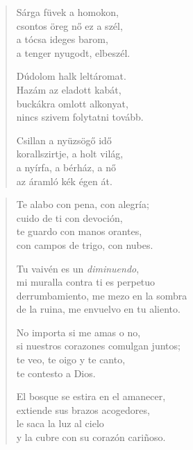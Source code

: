 \documentclass[11pt]{book}
\newcommand*{\centeredornament}{\centerline{\pgfornament[width=6cm]{88}}}
\begin{document}
\newpage

\vspace*{-15mm}
\centeredornament



\begin{verse}
  Sárga füvek a homokon, \\
  csontos öreg nő ez a szél, \\
  a tócsa ideges barom, \\
  a tenger nyugodt, elbeszél.

  Dúdolom halk leltáromat. \\
  Hazám az eladott kabát, \\
  buckákra omlott alkonyat, \\
  nincs szivem folytatni tovább.

  Csillan a nyüzsögő idő \\
  korallszirtje, a holt világ, \\
  a nyírfa, a bérház, a nő \\
  az áramló kék égen át.
\end{verse}

\newpage

\vspace*{-15mm}
\centeredornament



\begin{verse}
  Te alabo con pena, con alegría; \\
  cuido de ti con devoción, \\
  te guardo con manos orantes, \\
  con campos de trigo, con nubes.

  Tu vaivén es un \emph{diminuendo}, \\
  mi muralla contra ti es perpetuo \\
  derrumbamiento, me mezo en la sombra \\
  de la ruina, me envuelvo en tu aliento.

  No importa si me amas o no, \\
  si nuestros corazones comulgan juntos; \\
  te veo, te oigo y te canto, \\
  te contesto a Dios.

  El bosque se estira en el amanecer, \\
  extiende sus brazos acogedores, \\
  le saca la luz al cielo \\
  y la cubre con su corazón cariñoso.
\end{verse}
\end{document}
